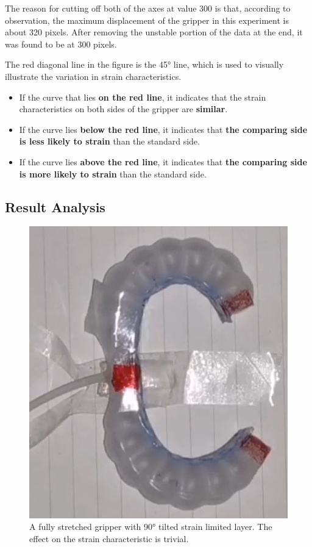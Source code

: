 \documentclass[conference]{IEEEtran}
\begin{document}
The reason for cutting off both of the axes at value 300 is that, according to observation, the maximum displacement of the gripper in this experiment is about 320 pixels. After removing the unstable portion of the data at the end, it was found to be at 300 pixels.



The red diagonal line in the figure is the 45° line, which is used to visually illustrate the variation in strain characteristics. 
\begin{itemize}
    \item If the curve that lies \textbf{on the red line}, it indicates that the strain characteristics on both sides of the gripper are \textbf{similar}. 
    \item If the curve lies \textbf{below the red line}, it indicates that \textbf{the comparing side is less likely to strain} than the standard side.
    \item If the curve lies \textbf{above the red line}, it indicates that \textbf{the comparing side is more likely to strain} than the standard side.
\end{itemize}


\subsection{Result Analysis}
\label{Analysis}

\begin{figure}
    \centering
    \includegraphics[width = 0.3\linewidth]{pics/Section3/Trivial.png}
    \caption{A fully stretched gripper with 90° tilted strain limited layer. The effect on the strain characteristic is trivial.}
    \label{fig:Trivial}
\end{figure}
\end{document}
